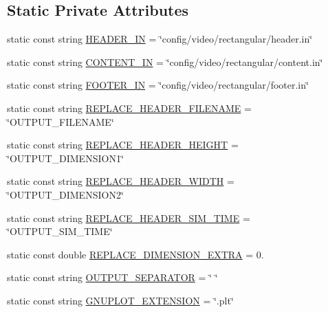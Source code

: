 \subsection*{Static Private Attributes}
\begin{DoxyCompactItemize}
\item 
static const string \hyperlink{classmultiscale_1_1video_1_1RectangularGnuplotScriptGenerator_afeced106138e618bb292826093205023}{H\-E\-A\-D\-E\-R\-\_\-\-I\-N} = \char`\"{}config/video/rectangular/header.\-in\char`\"{}
\item 
static const string \hyperlink{classmultiscale_1_1video_1_1RectangularGnuplotScriptGenerator_abbd954ff4d68e2a6ef9a7a81f615892c}{C\-O\-N\-T\-E\-N\-T\-\_\-\-I\-N} = \char`\"{}config/video/rectangular/content.\-in\char`\"{}
\item 
static const string \hyperlink{classmultiscale_1_1video_1_1RectangularGnuplotScriptGenerator_a5bff725c865bc3a426351644cee34229}{F\-O\-O\-T\-E\-R\-\_\-\-I\-N} = \char`\"{}config/video/rectangular/footer.\-in\char`\"{}
\item 
static const string \hyperlink{classmultiscale_1_1video_1_1RectangularGnuplotScriptGenerator_aba834d6608c58a4ea91d73947f2cfe0a}{R\-E\-P\-L\-A\-C\-E\-\_\-\-H\-E\-A\-D\-E\-R\-\_\-\-F\-I\-L\-E\-N\-A\-M\-E} = \char`\"{}O\-U\-T\-P\-U\-T\-\_\-\-F\-I\-L\-E\-N\-A\-M\-E\char`\"{}
\item 
static const string \hyperlink{classmultiscale_1_1video_1_1RectangularGnuplotScriptGenerator_a7c6bb61b310d321618f22d15f686fd44}{R\-E\-P\-L\-A\-C\-E\-\_\-\-H\-E\-A\-D\-E\-R\-\_\-\-H\-E\-I\-G\-H\-T} = \char`\"{}O\-U\-T\-P\-U\-T\-\_\-\-D\-I\-M\-E\-N\-S\-I\-O\-N1\char`\"{}
\item 
static const string \hyperlink{classmultiscale_1_1video_1_1RectangularGnuplotScriptGenerator_a2b9a87b266a126d6cdd6d6ee1d707b87}{R\-E\-P\-L\-A\-C\-E\-\_\-\-H\-E\-A\-D\-E\-R\-\_\-\-W\-I\-D\-T\-H} = \char`\"{}O\-U\-T\-P\-U\-T\-\_\-\-D\-I\-M\-E\-N\-S\-I\-O\-N2\char`\"{}
\item 
static const string \hyperlink{classmultiscale_1_1video_1_1RectangularGnuplotScriptGenerator_a9eaa6120a15c5055eb6fbe5b1113d806}{R\-E\-P\-L\-A\-C\-E\-\_\-\-H\-E\-A\-D\-E\-R\-\_\-\-S\-I\-M\-\_\-\-T\-I\-M\-E} = \char`\"{}O\-U\-T\-P\-U\-T\-\_\-\-S\-I\-M\-\_\-\-T\-I\-M\-E\char`\"{}
\item 
static const double \hyperlink{classmultiscale_1_1video_1_1RectangularGnuplotScriptGenerator_a90ca6d5bab28ed98c6adf71cb848676e}{R\-E\-P\-L\-A\-C\-E\-\_\-\-D\-I\-M\-E\-N\-S\-I\-O\-N\-\_\-\-E\-X\-T\-R\-A} = 0.
\item 
static const string \hyperlink{classmultiscale_1_1video_1_1RectangularGnuplotScriptGenerator_a8e42e0b2f41ffd1115f6123d45195ed0}{O\-U\-T\-P\-U\-T\-\_\-\-S\-E\-P\-A\-R\-A\-T\-O\-R} = \char`\"{} \char`\"{}
\item 
static const string \hyperlink{classmultiscale_1_1video_1_1RectangularGnuplotScriptGenerator_afa1626f7904b3006ac768f770c799283}{G\-N\-U\-P\-L\-O\-T\-\_\-\-E\-X\-T\-E\-N\-S\-I\-O\-N} = \char`\"{}.plt\char`\"{}
\end{DoxyCompactItemize}


